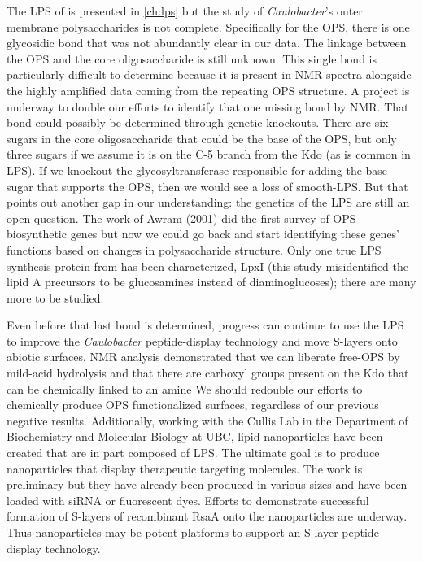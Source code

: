 The \ac{LPS} of \caulobacter{} is presented in \cref{ch:lps} but the study of \textit{Caulobacter}'s outer membrane polysaccharides is not complete. Specifically for the \ac{OPS}, there is one glycosidic bond that was not abundantly clear in our data. The linkage between the \ac{OPS} and the core oligosaccharide is still unknown. This  single bond is particularly difficult to determine because it is present in \ac{NMR} spectra alongside the highly amplified data coming from the repeating \ac{OPS} structure. A project is underway to double our efforts to identify that one missing bond by \ac{NMR}. That bond could possibly  be determined through genetic knockouts. There are six sugars in the core oligosaccharide that could be the base of the \ac{OPS}, but only three sugars if we assume it is on the C-5 branch from the Kdo (as is common in LPS). If we knockout the glycosyltransferase responsible for adding the base sugar that supports the \ac{OPS}, then we would see a loss of smooth-\ac{LPS}. But that points out another gap in our understanding: the genetics of the \caulobacter{} \ac{LPS} are still an open question. The work of Awram \etal{} (2001) did the first survey of \ac{OPS} biosynthetic genes but now we could go back and start identifying these genes' functions based on changes in polysaccharide structure. Only one true \ac{LPS} synthesis protein from \caulobacter{} has been characterized, LpxI (this study misidentified the \caulobacter lipid A precursors to be glucosamines instead of diaminoglucoses); there are many more to be studied. 

Even before that last bond is determined, progress can continue to use the \ac{LPS} to improve the \textit{Caulobacter} peptide-display technology and move \acp{S-layer} onto abiotic surfaces. \Ac{NMR} analysis demonstrated that we can liberate free-\ac{OPS} by mild-acid hydrolysis and that there are carboxyl groups present on the Kdo that can be chemically linked to an amine We should redouble our efforts to chemically produce \ac{OPS} functionalized surfaces, regardless of our previous negative results.  Additionally, working with the Cullis Lab in the Department of Biochemistry and Molecular Biology at UBC, lipid nanoparticles have been created that are in part  composed of \caulobacter \ac{LPS}. The ultimate goal is to produce nanoparticles that display therapeutic targeting molecules. The work is preliminary but they have already been produced in various sizes and have been loaded with siRNA or fluorescent dyes. Efforts to demonstrate successful formation of \acp{S-layer} of recombinant RsaA onto the nanoparticles are underway. Thus nanoparticles  may be potent platforms to support an \ac{S-layer} peptide-display technology.

